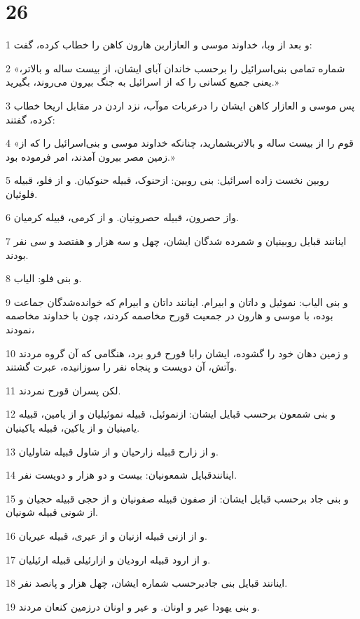 \chapter{26}

\par 1 و بعد از وبا، خداوند موسی و العازاربن هارون کاهن را خطاب کرده، گفت:
\par 2 «شماره تمامی بنی‌اسرائیل را برحسب خاندان آبای ایشان، از بیست ساله و بالاتر، یعنی جمیع کسانی را که از اسرائیل به جنگ بیرون می‌روند، بگیرید.»
\par 3 پس موسی و العازار کاهن ایشان را درعربات موآب، نزد اردن در مقابل اریحا خطاب کرده، گفتند:
\par 4 «قوم را از بیست ساله و بالاتربشمارید، چنانکه خداوند موسی و بنی‌اسرائیل را که از زمین مصر بیرون آمدند، امر فرموده بود.»
\par 5 روبین نخست زاده اسرائیل: بنی روبین: ازحنوک، قبیله حنوکیان. و از فلو، قبیله فلوئیان.
\par 6 واز حصرون، قبیله حصرونیان. و از کرمی، قبیله کرمیان.
\par 7 اینانند قبایل روبینیان و شمرده شدگان ایشان، چهل و سه هزار و هفتصد و سی نفر بودند.
\par 8 و بنی فلو: الیاب.
\par 9 و بنی الیاب: نموئیل و داتان و ابیرام. اینانند داتان و ابیرام که خوانده‌شدگان جماعت بوده، با موسی و هارون در جمعیت قورح مخاصمه کردند، چون با خداوند مخاصمه نمودند،
\par 10 و زمین دهان خود را گشوده، ایشان رابا قورح فرو برد، هنگامی که آن گروه مردند وآتش، آن دویست و پنجاه نفر را سوزانیده، عبرت گشتند.
\par 11 لکن پسران قورح نمردند.
\par 12 و بنی شمعون برحسب قبایل ایشان: ازنموئیل، قبیله نموئیلیان و از یامین، قبیله یامینیان و از یاکین، قبیله یاکینیان.
\par 13 و از زارح قبیله زارحیان و از شاول قبیله شاولیان.
\par 14 اینانندقبایل شمعونیان: بیست و دو هزار و دویست نفر.
\par 15 و بنی جاد برحسب قبایل ایشان: از صفون قبیله صفونیان و از حجی قبیله حجیان و از شونی قبیله شونیان.
\par 16 و از ازنی قبیله ازنیان و از عیری، قبیله عیریان.
\par 17 و از ارود قبیله ارودیان و ازارئیلی قبیله ارئیلیان.
\par 18 اینانند قبایل بنی جادبرحسب شماره ایشان، چهل هزار و پانصد نفر.
\par 19 و بنی یهودا عیر و اونان. و عیر و اونان درزمین کنعان مردند.
